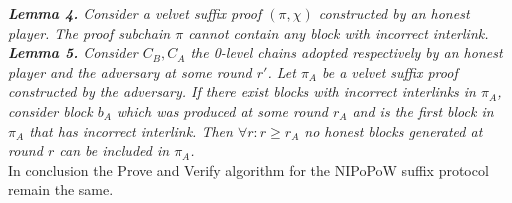 \textit{\textbf{Lemma 4.} Consider a velvet suffix proof $(\pi, \chi)$ constructed 
by an honest player. The proof subchain $\pi$ cannot contain any block with 
incorrect interlink.}\\

\textit{\textbf{Lemma 5.} Consider $C_B, C_A$ the 0-level chains adopted respectively
by an honest player and the adversary at some round $r'$. Let $\pi_A$ be a velvet
suffix proof constructed by the adversary. If there exist blocks with incorrect
interlinks in $\pi_A$, consider block $b_A$ which was produced at some round
$r_A$ and is the first block in $\pi_A$ that has incorrect interlink. Then
$\forall r: r \geq r_A$ no honest blocks generated at round $r$ can be included in $\pi_A$.} \\

In conclusion the Prove and Verify algorithm for the NIPoPoW suffix protocol remain the same.
